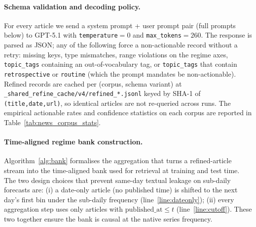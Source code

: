 \documentclass{article}
\begin{document}
\paragraph{Schema validation and decoding policy.}
For every article we send a system prompt + user prompt pair (full prompts below) to GPT-5.1 with \texttt{temperature}${=}0$ and \texttt{max\_tokens}${=}260$. The response is parsed as JSON; any of the following force a non-actionable record without a retry: missing keys, type mismatches, range violations on the regime axes, \texttt{topic\_tags} containing an out-of-vocabulary tag, or \texttt{topic\_tags} that contain \texttt{retrospective} or \texttt{routine} (which the prompt mandates be non-actionable). Refined records are cached per (corpus, schema variant) at \texttt{\_shared\_refine\_cache/v4/refined\_*.jsonl} keyed by SHA-1 of \texttt{(title,date,url)}, so identical articles are not re-queried across runs. The empirical actionable rates and confidence statistics on each corpus are reported in Table~\ref{tab:news_corpus_stats}.

\paragraph{Time-aligned regime bank construction.}
Algorithm~\ref{alg:bank} formalises the aggregation that turns a refined-article stream into the time-aligned bank used for retrieval at training and test time. The two design choices that prevent same-day textual leakage on sub-daily forecasts are: (i) a date-only article (no published time) is shifted to the next day's first bin under the sub-daily frequency (line~\ref{line:dateonly}); (ii) every aggregation step uses only articles with $\mathrm{published\_at}\!\le\!t$ (line~\ref{line:cutoff}). These two together ensure the bank is causal at the native series frequency.
\end{document}
